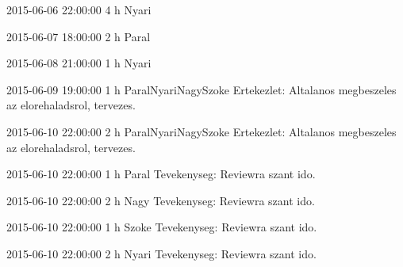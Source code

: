 \begin{naplo}
            \bejegyzes
            {2015-06-06 22:00:00}
            {4 h}
            {Nyari}
            {}
           

            \bejegyzes
            {2015-06-07 18:00:00}
            {2 h}
            {Paral}
            {}
            
            \bejegyzes
            {2015-06-08 21:00:00}
            {1 h}
            {Nyari}
            {}

            \bejegyzes
            {2015-06-09 19:00:00}
            {1 h}
            {Paral\newline Nyari\newline Nagy\newline Szoke}
            {Ertekezlet: Altalanos megbeszeles az elorehaladsrol, tervezes.}

            \bejegyzes
            {2015-06-10 22:00:00}
            {2 h}
            {Paral\newline Nyari\newline Nagy\newline Szoke}
            {Ertekezlet: Altalanos megbeszeles az elorehaladsrol, tervezes.}

            \bejegyzes
            {2015-06-10 22:00:00}
            {1 h}
            {Paral}
            {Tevekenyseg: Reviewra szant ido.}
           

            \bejegyzes
            {2015-06-10 22:00:00}
            {2 h}
            {Nagy}
            {Tevekenyseg: Reviewra szant ido.}
           

            \bejegyzes
            {2015-06-10 22:00:00}
            {1 h}
            {Szoke}
            {Tevekenyseg: Reviewra szant ido.}
           

            \bejegyzes
            {2015-06-10 22:00:00}
            {2 h}
            {Nyari}
            {Tevekenyseg: Reviewra szant ido.}
           
\end{naplo}
